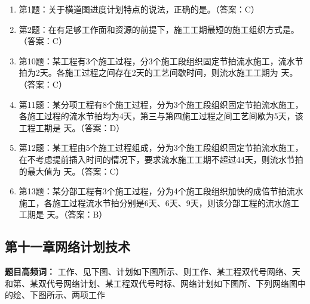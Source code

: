 \documentclass[UTF8,fontset=fandol,11pt]{ctexart}
\begin{document}
\begin{enumerate}[label=\arabic*.]

\item 第1题：关于横道图进度计划特点的说法，正确的是。（答案：C）

\item 第2题：在有足够工作面和资源的前提下，施工工期最短的施工组织方式是。（答案：C）

\item 第10题：某工程有3个施工过程，分3个施工段组织固定节拍流水施工，流水节拍为2天。各施工过程之间存在2天的工艺间歇时间，则流水施工工期为 天。（答案：C）

\item 第11题：某分项工程有8个施工过程，分为3个施工段组织固定节拍流水施工，各施工过程的流水节拍均为4天，第三与第四施工过程之间工艺间歇为5天，该工程工期是 天。（答案：D）

\item 第12题：某工程由5个施工过程组成，分为3个施工段组织固定节拍流水施工，在不考虑提前插入时间的情况下，要求流水施工工期不超过44天，则流水节拍的最大值为 天。（答案：C）

\item 第13题：某分部工程有3个施工过程，分为4个施工段组织加快的成倍节拍流水施工，各施工过程流水节拍分别是6天、6天、9天，则该分部工程的流水施工工期是 天。（答案：B）

\end{enumerate}

\newpage

\subsection*{第十一章网络计划技术}

\begin{mainbox}

\textbf{题目高频词：} 工作、见下图、计划如下图所示、则工作、某工程双代号网络、天和第、某双代号网络计划、某工程双代号时标、网络计划如下图所、下列网络图中的绘、下图所示、两项工作

\end{mainbox}
\end{document}
